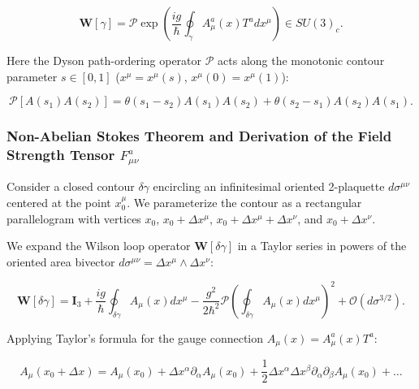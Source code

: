 \begin{equation}\label{eq:2.3.5}\tag{2.3.5}
\mathbf{W}[\gamma] = \mathcal{P}\exp\left( \frac{ig}{\hbar} \oint_{\gamma} A_\mu^a(x) T^a dx^\mu \right) \in SU(3)_c.
\end{equation}

Here the Dyson path-ordering operator $\mathcal{P}$ acts along the monotonic contour parameter $s \in [0, 1]$ ($x^\mu = x^\mu(s)$, $x^\mu(0) = x^\mu(1)$):

\begin{equation}\label{eq:2.3.6}\tag{2.3.6}
\mathcal{P}\left[ A(s_1) A(s_2) \right] = \theta(s_1 - s_2) A(s_1) A(s_2) + \theta(s_2 - s_1) A(s_2) A(s_1).
\end{equation}

\subsubsection{Non-Abelian Stokes Theorem and Derivation of the Field Strength Tensor $F_{\mu\nu}^a$}\label{sec:2.3.2}

Consider a closed contour $\delta\gamma$ encircling an infinitesimal oriented 2-plaquette $d\sigma^{\mu\nu}$ centered at the point $x_0^\mu$. We parameterize the contour as a rectangular parallelogram with vertices $x_0$, $x_0 + \Delta x^\mu$, $x_0 + \Delta x^\mu + \Delta x^\nu$, and $x_0 + \Delta x^\nu$.

We expand the Wilson loop operator $\mathbf{W}[\delta\gamma]$ in a Taylor series in powers of the oriented area bivector $d\sigma^{\mu\nu} = \Delta x^\mu \wedge \Delta x^\nu$:

\begin{equation}\label{eq:2.3.7}\tag{2.3.7}
\mathbf{W}[\delta\gamma] = \mathbf{I}_3 + \frac{ig}{\hbar} \oint_{\delta\gamma} A_\mu(x) dx^\mu - \frac{g^2}{2\hbar^2} \mathcal{P} \left( \oint_{\delta\gamma} A_\mu(x) dx^\mu \right)^2 + \mathcal{O}(d\sigma^{3/2}).
\end{equation}

Applying Taylor's formula for the gauge connection $A_\mu(x) = A_\mu^a(x) T^a$:

\begin{equation*}
A_\mu(x_0 + \Delta x) = A_\mu(x_0) + \Delta x^\alpha \partial_\alpha A_\mu(x_0) + \frac{1}{2} \Delta x^\alpha \Delta x^\beta \partial_\alpha \partial_\beta A_\mu(x_0) + \dots
\end{equation*}

